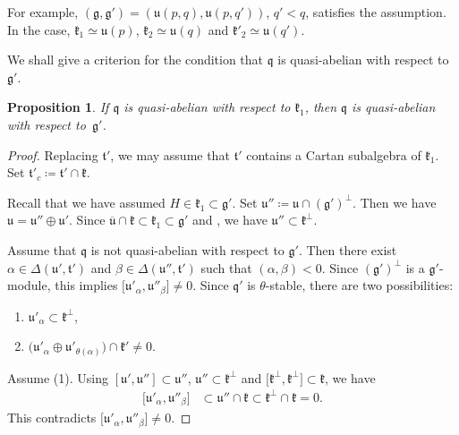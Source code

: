 \documentclass[10pt,a4paper]{amsart}
\numberwithin{equation}{section}
\newtheorem{Proposition}[Theorem]{Proposition}
\theoremstyle{definition}
\newcommand{\classicalg}[1]{\mathfrak{#1}}
\newcommand{\lie}[1]{\mathfrak{#1}}
\newcommand{\lieU}{\classicalg{u}}
\begin{document}
For example, $(\lie{g}, \lie{g'}) = (\lieU(p, q), \lieU(p, q'))$, $q' < q$, satisfies the assumption.
In the case, ${\lie{k}_1 \simeq \lieU(p)}$, $\lie{k}_2 \simeq \lieU(q)$ and $\lie{k}'_2 \simeq \lieU(q')$.

We shall give a criterion for the condition that $\lie{q}$ is quasi-abelian with respect to $\lie{g'}$.

\begin{Proposition}\label{prop:QuasiAbelianZuckerman}
	If $\lie{q}$ is quasi-abelian with respect to $\lie{k}_1$, then $\lie{q}$ is quasi-abelian with respect to~$\lie{g'}$.
\end{Proposition}

\begin{proof}
	Replacing $\lie{t'}$, we may assume that $\lie{t'}$ contains a Cartan subalgebra of $\lie{k}_1$.
	Set $\lie{t}'_{c}\coloneq\lie{t}'\cap \lie{k}$.

	Recall that we have assumed $H \in \lie{k}_1 \subset \lie{g'}$.
	Set $\lie{u}''\coloneq \lie{u}\cap (\lie{g'})^{\perp}$.
	Then we have $\lie{u} = \lie{u}'' \oplus \lie{u}'$.
	Since $\lie{\overline{u}}\cap \lie{k}\subset \lie{k}_1\subset \lie{g'}$ and \smash{$\lie{u} = (\lie{u}\cap \lie{k}) \oplus \bigl(\lie{u} \cap \lie{k}^\perp\bigr)$}, we have $\lie{u}'' \subset \lie{k}^{\perp}$.

	Assume that $\lie{q}$ is not quasi-abelian with respect to $\lie{g}'$.
	Then there exist $\alpha \in \Delta(\lie{u'}, \lie{t'})$ and $\beta \in \Delta(\lie{u''}, \lie{t'})$
	such that $(\alpha, \beta) < 0$.
	Since $(\lie{g'})^{\perp}$ is a $\lie{g}'$-module, this implies $\bigl[\lie{u}'_{\alpha}, \lie{u}''_{\beta}\bigr] \neq 0$.
	Since $\lie{q}'$ is $\theta$-stable, there are two possibilities:
	\begin{enumerate}\itemsep=0pt
		\item[(1)] $\lie{u}'_{\alpha} \subset \lie{k}^{\perp}$,
		\item[(2)] $\bigl(\lie{u}'_{\alpha}\oplus \lie{u}'_{\theta(\alpha)}\bigr) \cap \lie{k}'\neq 0$.
	\end{enumerate}

	Assume (1).
	Using $[\lie{u}', \lie{u}'']\subset \lie{u}''$, $\lie{u}'' \subset \lie{k}^{\perp}$ and $\bigl[\lie{k}^{\perp}, \lie{k}^{\perp}\bigr] \subset \lie{k}$,
	we have
	\begin{align*}
	\bigl[\lie{u}'_{\alpha}, \lie{u}''_{\beta}\bigr] &\subset \lie{u}'' \cap \lie{k}
	\subset \lie{k}^{\perp} \cap \lie{k} =0.
	\end{align*}
	This contradicts $\bigl[\lie{u}'_{\alpha}, \lie{u}''_{\beta}\bigr] \neq 0$.


\end{proof}
\end{document}
